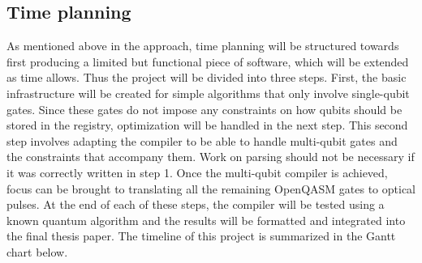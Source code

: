 \subsection{Time planning}
\label{sec:Time}
As mentioned above in the approach, time planning will be structured towards first producing a limited but functional piece of software, which will be extended as time allows. Thus the project will be divided into three steps. First, the basic infrastructure will be created for simple algorithms that only involve
single-qubit gates. Since these gates do not impose any constraints on how qubits should be stored in the registry, optimization will be handled in the next step.
This second step involves adapting the compiler to be able to handle multi-qubit gates and the constraints that accompany them. Work on parsing should not be necessary 
if it was correctly written in step 1.
Once the multi-qubit compiler is achieved, focus can be brought to translating all the remaining OpenQASM gates to optical pulses. At the end of each of these steps, the
compiler will be tested using a known quantum algorithm and the results will be formatted and integrated into the final thesis paper. The timeline of this project is 
summarized in the Gantt chart below.
